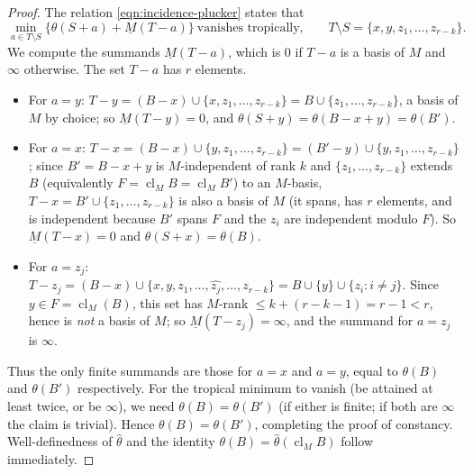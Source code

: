 \documentclass{article}
\theoremstyle{definition}
\newcommand{\cl}{\operatorname{cl}}
\begin{document}
\begin{proof}
The relation \eqref{eqn:incidence-plucker} states that
\[
  \min_{a\in T\setminus S}\bigl\{\theta(S+a)+\underline M(T-a)\bigr\}\ \text{vanishes tropically,}
  \qquad T\setminus S=\{x,y,z_1,\dots,z_{r-k}\}.
\]
We compute the summands $\underline M(T-a)$, which is $0$ if $T-a$ is a basis of $M$ and $\infty$
otherwise. The set $T-a$ has $r$ elements.
\begin{itemize}
\item For $a=y$: $T-y=(B-x)\cup\{x,z_1,\dots,z_{r-k}\}=B\cup\{z_1,\dots,z_{r-k}\}$, a basis of $M$
by choice; so $\underline M(T-y)=0$, and $\theta(S+y)=\theta(B-x+y)=\theta(B')$.
\item For $a=x$: $T-x=(B-x)\cup\{y,z_1,\dots,z_{r-k}\}=(B'-y)\cup\{y,z_1,\dots,z_{r-k}\}$; since
$B'=B-x+y$ is $M$-independent of rank $k$ and $\{z_1,\dots,z_{r-k}\}$ extends $B$ (equivalently
$F=\cl_M B=\cl_M B'$) to an $M$-basis, $T-x=B'\cup\{z_1,\dots,z_{r-k}\}$ is also a basis of $M$
(it spans, has $r$ elements, and is independent because $B'$ spans $F$ and the $z_i$ are independent
modulo $F$). So $\underline M(T-x)=0$ and $\theta(S+x)=\theta(B)$.
\item For $a=z_j$: $T-z_j=(B-x)\cup\{x,y,z_1,\dots,\widehat{z_j},\dots,z_{r-k}\}=B\cup\{y\}\cup
\{z_i:i\ne j\}$. Since $y\in F=\cl_M(B)$, this set has $M$-rank $\le k+(r-k-1)=r-1<r$, hence is
\emph{not} a basis of $M$; so $\underline M(T-z_j)=\infty$, and the summand for $a=z_j$ is $\infty$.
\end{itemize}
Thus the only finite summands are those for $a=x$ and $a=y$, equal to $\theta(B)$ and $\theta(B')$
respectively. For the tropical minimum to vanish (be attained at least twice, or be $\infty$), we
need $\theta(B)=\theta(B')$ (if either is finite; if both are $\infty$ the claim is trivial). Hence
$\theta(B)=\theta(B')$, completing the proof of constancy. Well-definedness of $\widehat\theta$ and
the identity $\theta(B)=\widehat\theta(\cl_M B)$ follow immediately.
\end{proof}
\end{document}
